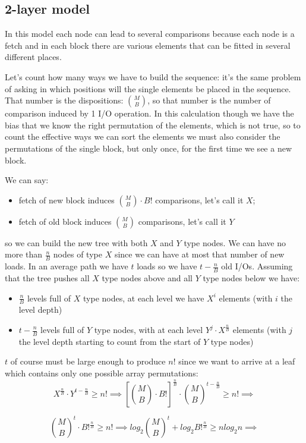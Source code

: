\subsection{2-layer model}
In this model each node can lead to several comparisons because each node is a fetch and in each block there are various elements that can be fitted in several different places.

Let's count how many ways we have to build the sequence: it's the same problem of asking in which positions will the single elements be placed in the sequence.
That number is the dispositions: $\binom{M}{B}$, so that number is the number of comparison induced by 1 I/O operation.
In this calculation though we have the bias that we know the right permutation of the elements, which is not true, so to count the effective ways we can sort the elements we must also consider the permutations of the single block, but only once, for the first time we see a new block.

We can say:
\begin{itemize}
    \item fetch of new block induces $\binom{M}{B} \cdot B!$ comparisons, let's call it $X$;
    \item fetch of old block induces $\binom{M}{B}$ comparisons, let's call it $Y$
\end{itemize}
so we can build the new tree with both $X$ and $Y$ type nodes.
We can have no more than $\frac{n}{B}$ nodes of type $X$ since we can have at most that number of new loads.
In an average path we have $t$ loads so we have $t - \frac{n}{B}$ old I/Os.
Assuming that the tree pushes all $X$ type nodes above and all $Y$ type nodes below we have:
\begin{itemize}
    \item $\frac{n}{B}$ levels full of $X$ type nodes, at each level we have $X^i$ elements (with $i$ the level depth) 
    \item $t-\frac{n}{B}$ levels full of $Y$ type nodes, with at each level $Y^j \cdot X^{\frac{n}{B}}$ elements (with $j$ the level depth starting to count from the start of $Y$ type nodes)
\end{itemize}
$t$ of course must be large enough to produce $n!$ since we want to arrive at a leaf which contains only one possible array permutations:
$$
    X^{\frac{n}{B}} \cdot Y^{t - \frac{n}{B}} \geq n! \implies \left[\binom{M}{B} \cdot B!\right]^{\frac{n}{B}} \cdot \binom{M}{B}^{t-\frac{n}{B}} \geq n! \implies
$$

$$
    \binom{M}{B}^t \cdot B!^{\frac{n}{B}} \geq n! \implies log_2 \binom{M}{B}^t + log_2 B!^{\frac{n}{B}} \geq n log_2 n \implies
$$

